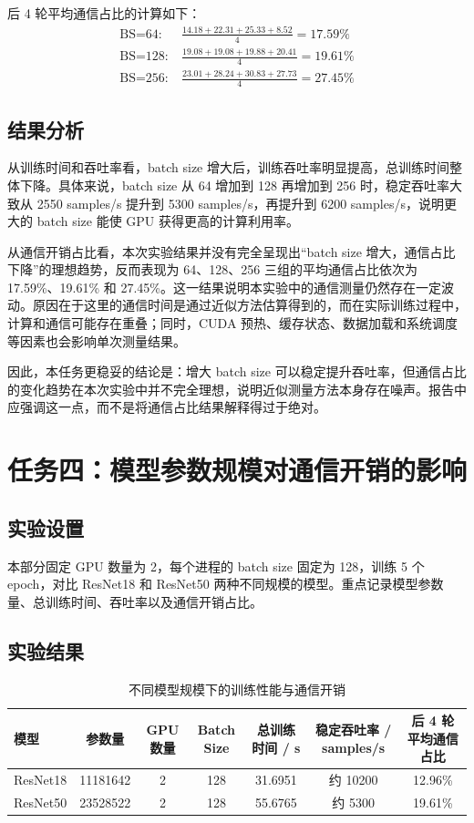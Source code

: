 \documentclass{article}
\begin{document}
后 4 轮平均通信占比的计算如下：
\begin{align*}
  \text{BS=64}:&\ \frac{14.18 + 22.31 + 25.33 + 8.52}{4} = 17.59\% \\
  \text{BS=128}:&\ \frac{19.08 + 19.08 + 19.88 + 20.41}{4} = 19.61\% \\
  \text{BS=256}:&\ \frac{23.01 + 28.24 + 30.83 + 27.73}{4} = 27.45\%
\end{align*}

\subsection{结果分析}
从训练时间和吞吐率看，batch size 增大后，训练吞吐率明显提高，总训练时间整体下降。具体来说，batch size 从 64 增加到 128 再增加到 256 时，稳定吞吐率大致从 2550 samples/s 提升到 5300 samples/s，再提升到 6200 samples/s，说明更大的 batch size 能使 GPU 获得更高的计算利用率。

从通信开销占比看，本次实验结果并没有完全呈现出“batch size 增大，通信占比下降”的理想趋势，反而表现为 64、128、256 三组的平均通信占比依次为 17.59\%、19.61\% 和 27.45\%。这一结果说明本实验中的通信测量仍然存在一定波动。原因在于这里的通信时间是通过近似方法估算得到的，而在实际训练过程中，计算和通信可能存在重叠；同时，CUDA 预热、缓存状态、数据加载和系统调度等因素也会影响单次测量结果。

因此，本任务更稳妥的结论是：增大 batch size 可以稳定提升吞吐率，但通信占比的变化趋势在本次实验中并不完全理想，说明近似测量方法本身存在噪声。报告中应强调这一点，而不是将通信占比结果解释得过于绝对。

\section{任务四：模型参数规模对通信开销的影响}
\subsection{实验设置}
本部分固定 GPU 数量为 2，每个进程的 batch size 固定为 128，训练 5 个 epoch，对比 ResNet18 和 ResNet50 两种不同规模的模型。重点记录模型参数量、总训练时间、吞吐率以及通信开销占比。

\subsection{实验结果}
\begin{table}[H]
  \centering
  \caption{不同模型规模下的训练性能与通信开销}
  \label{tab:model_scale_result}
  \begin{tabular}{lcccccc}
    \toprule
    模型 & 参数量 & GPU 数量 & Batch Size & 总训练时间 / s & 稳定吞吐率 / samples/s & 后 4 轮平均通信占比 \\
    \midrule
    ResNet18 & 11181642 & 2 & 128 & 31.6951 & 约 10200 & 12.96\% \\
    ResNet50 & 23528522 & 2 & 128 & 55.6765 & 约 5300 & 19.61\% \\
    \bottomrule
  \end{tabular}
\end{table}
\end{document}
